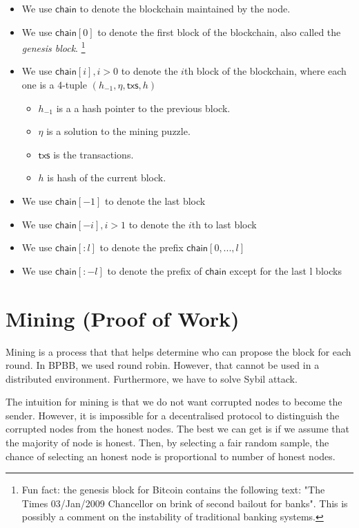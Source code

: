 \documentclass[twoside]{article}
\begin{document}
\begin{itemize}
    \item We use $\textsf{chain}$ to denote the blockchain maintained by the node.
    \item We use $\textsf{chain}[0]$ to denote the first block of the blockchain, also called the \emph{genesis block}. \footnote{Fun fact: the genesis block for Bitcoin contains the following text: "The Times 03/Jan/2009 Chancellor on brink of second bailout for banks". This is possibly a comment on the instability of traditional banking systems.}
    \item We use $\textsf{chain}[i], i > 0$ to denote the $i$th block of the blockchain, where each one is a 4-tuple $(h_{-1}, \eta, \textsf{txs}, h)$ 
    \begin{itemize}
        \item $h_{-1}$ is a a hash pointer to the previous block.
        \item $\eta$ is a solution to the mining puzzle.
        \item $\textsf{txs}$ is the transactions.
        \item $h$ is hash of the current block.
    \end{itemize}
    \item We use $\textsf{chain}[-1]$ to denote the last block
    \item We use $\textsf{chain}[-i], i > 1$ to denote the $i$th to last block
    \item We use $\textsf{chain}[:l]$ to denote the prefix $\textsf{chain}[0,...,l]$
    \item We use $\textsf{chain}[:-l]$ to denote the prefix of $\textsf{chain}$ except for the last l blocks
\end{itemize}

\section{Mining (Proof of Work)}

Mining is a process that that helps determine who can propose the block for each round. In BPBB, we used round robin. However, that cannot be used in a distributed environment. Furthermore, we have to solve Sybil attack. 

The intuition for mining is that we do not want corrupted nodes to become the sender. However, it is impossible for a decentralised protocol to distinguish the corrupted nodes from the honest nodes. The best we can get is if we assume that the majority of node is honest. Then, by selecting a fair random sample, the chance of selecting an honest node is proportional to number of honest nodes.
\end{document}
